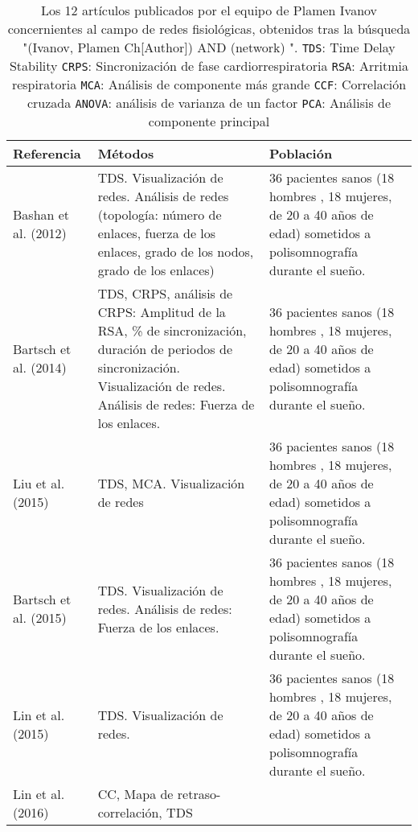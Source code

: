 \documentclass[twoside,twocolumn]{article}
\begin{document}
\onecolumn
\begin{center}
  \begin{longtable}{|p{}p{}p{}|}
    \caption{Los 12 artículos publicados por el equipo de Plamen Ivanov concernientes al campo de redes fisiológicas, obtenidos tras la búsqueda "(Ivanov, Plamen Ch[Author]) AND (network) ".
    \texttt{TDS}: Time Delay Stability
    \texttt{CRPS}: Sincronización de fase cardiorrespiratoria
    \texttt{RSA}: Arritmia respiratoria
    \texttt{MCA}: Análisis de componente más grande
    \texttt{CCF}: Correlación cruzada
    \texttt{ANOVA}: análisis de varianza de un factor
    \texttt{PCA}: Análisis de componente principal
    }\\
    \hline
    \textbf{Referencia} & \textbf{Métodos} & \textbf{Población} \\
    \hline
    Bashan et al. (2012) \cite{bashan2012network} &
    TDS.
    Visualización de redes.
    Análisis de redes (topología: número de enlaces, fuerza de los enlaces, grado de los nodos, grado de los enlaces)
    &
    36 pacientes sanos (18 hombres , 18 mujeres, de 20 a 40 años de edad) sometidos a polisomnografía durante el sueño.
    \\ \hline
    Bartsch et al. (2014)\cite{bartsch2014coexisting} &
    TDS, CRPS, análisis de CRPS: Amplitud de la RSA, \% de sincronización, duración de periodos de sincronización.
    Visualización de redes.
    Análisis de redes: Fuerza de los enlaces.
    &
    36 pacientes sanos (18 hombres , 18 mujeres, de 20 a 40 años de edad) sometidos a polisomnografía durante el sueño.
    \\ \hline
    Liu et al. (2015)\cite{liu2015major} &
    TDS, MCA.
    Visualización de redes
    &
    36 pacientes sanos (18 hombres , 18 mujeres, de 20 a 40 años de edad) sometidos a polisomnografía durante el sueño.
    \\ \hline
    Bartsch et al. (2015)\cite{bartsch2015network} &
    TDS.
    Visualización de redes.
    Análisis de redes: Fuerza de los enlaces.
    &
    36 pacientes sanos (18 hombres , 18 mujeres, de 20 a 40 años de edad) sometidos a polisomnografía durante el sueño.
    \\ \hline
    Lin et al. (2015) \cite{2015Plasticity} &
    TDS.
    Visualización de redes.
    &
    36 pacientes sanos (18 hombres , 18 mujeres, de 20 a 40 años de edad) sometidos a polisomnografía durante el sueño.
    \\ \hline
    Lin et al. (2016)\cite{lin2016delay} &
    CC,
    Mapa de retraso-correlación, TDS

\end{longtable}
\end{center}
\end{document}
